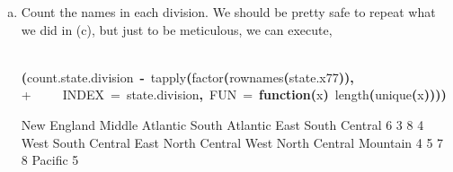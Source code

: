 \documentclass{article}
\newcommand{\hlfunctioncall}[1]{\textcolor[rgb]{1,0,0}{#1}}%
\newcommand{\hlkeyword}[1]{\textcolor[rgb]{0,0,0}{\textbf{#1}}}%
\newcommand{\hlargument}[1]{\textcolor[rgb]{0.694117647058824,0.247058823529412,0.0196078431372549}{#1}}%
\newcommand{\hlformalargs}[1]{\textcolor[rgb]{0.0705882352941176,0.713725490196078,0.0705882352941176}{#1}}%
\newcommand{\hlassignement}[1]{\textcolor[rgb]{0.215686274509804,0.215686274509804,0.384313725490196}{\textbf{#1}}}%
\newcommand{\hlsymbol}[1]{\textcolor[rgb]{0,0,0}{#1}}%
\newcommand{\hlprompt}[1]{\textcolor[rgb]{0,0,0}{#1}}%
\newcommand{\hlstd}[1]{\textcolor[rgb]{0,0,0}{#1}}%
\newenvironment{Houtput}{\raggedright}{%
%
}
\begin{document}
\begin{enumerate}[(a)]
\begin{Houtput}
\begin{Schunk}
\end{Schunk}
\end{Houtput}
        \item Count the names in each division. We should be pretty safe to repeat what we did in (c), but just to be meticulous, we can execute,
\begin{Houtput}
\hspace*{\fill}\\
\hlstd{}\ttfamily\noindent
\hlprompt{\usebox{\hlnormalsizeboxgreaterthan}{\ }}\hlkeyword{(}\hlsymbol{count.state.division}{\ }\hlassignement{\usebox{\hlnormalsizeboxlessthan}-}{\ }\hlfunctioncall{tapply}\hlkeyword{(}\hlfunctioncall{factor}\hlkeyword{(}\hlfunctioncall{rownames}\hlkeyword{(}\hlsymbol{state.x77}\hlkeyword{)}\hlkeyword{)}\hlkeyword{,}\hspace*{\fill}\\
\hlstd{}\hlprompt{+{\ }}{\ }{\ }{\ }{\ }\hlargument{INDEX}{\ }\hlargument{=}{\ }\hlsymbol{state.division}\hlkeyword{,}{\ }\hlargument{FUN}{\ }\hlargument{=}{\ }\hlkeyword{function}\hlkeyword{(}\hlformalargs{x}\hlkeyword{)}{\ }\hlfunctioncall{length}\hlkeyword{(}\hlfunctioncall{unique}\hlkeyword{(}\hlsymbol{x}\hlkeyword{)}\hlkeyword{)}\hlkeyword{)}\hlkeyword{)}\mbox{}
\normalfont
\hspace*{\fill}\\
\hlstd{}\begin{Schunk}
\begin{Soutput}
       New England    Middle Atlantic     South Atlantic East South Central 
                 6                  3                  8                  4 
West South Central East North Central West North Central           Mountain 
                 4                  5                  7                  8 
           Pacific 
                 5 
\end{Soutput}


\end{Schunk}
\end{Houtput}
\end{enumerate}
\end{document}
